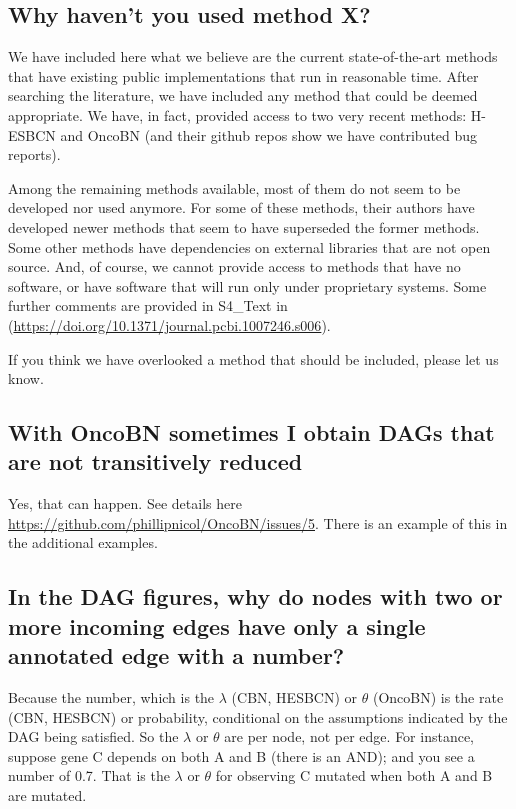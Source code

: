 \documentclass[a4paper,11pt]{article}
\begin{document}
 

\subsection{Why haven't you used method X?}\label{other_methods}

We have included here what we believe are the current state-of-the-art methods that have existing public implementations that run in reasonable time. After searching the literature, we have included any method that could be deemed appropriate. We have, in fact, provided access to two very recent methods: H-ESBCN and OncoBN (and their github repos show we have contributed bug reports).

Among the remaining methods available, most of them do not seem to be developed nor used anymore. For some of these methods, their authors have developed newer methods that seem to have superseded the former methods. Some other methods  have dependencies on external libraries that are not open source.  And, of course, we cannot provide access to methods that have no software, or have software that will run only under proprietary systems. Some further comments are provided in S4\_Text in \cite{diaz2019every} (\url{https://doi.org/10.1371/journal.pcbi.1007246.s006}).

If you think we have overlooked a method that should be included, please let us know.




\subsection{With OncoBN sometimes I obtain DAGs that are not transitively reduced}

Yes, that can happen. See details here \url{https://github.com/phillipnicol/OncoBN/issues/5}. There is an example of this in the additional examples.


\subsection{In the DAG figures, why do nodes with two or more incoming edges have only a single annotated edge with a number?}
\label{faq-single-num}

Because the number, which is the $\lambda$ (CBN, HESBCN) or $\theta$ (OncoBN) is the rate (CBN, HESBCN) or probability, conditional on the assumptions indicated by the DAG being satisfied. So the $\lambda$ or $\theta$ are per node, not per edge. For instance, suppose gene C depends on both A and B (there is an AND); and you see a number of 0.7. That is the $\lambda$ or $\theta$ for observing C mutated when both A and B are mutated. 
\end{document}
